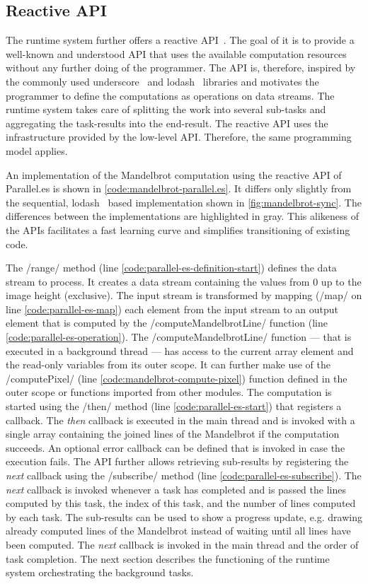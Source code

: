 \subsection{Reactive API}
The runtime system further offers a reactive API~\cite{Meijer2012}. The goal of it is to provide a well-known and understood API that uses the available computation resources without any further doing of the programmer. The API is, therefore, inspired by the commonly used underscore~\cite{underscorejs} and lodash~\cite{lodash} libraries and motivates the programmer to define the computations as operations on data streams. The runtime system takes care of splitting the work into several sub-tasks and aggregating the task-results into the end-result. The reactive API uses the infrastructure provided by the low-level API. Therefore, the same programming model applies.


 An implementation of the Mandelbrot computation using the reactive API of Parallel.es is shown in \cref{code:mandelbrot-parallel.es}. It differs only slightly from the sequential, lodash~\cite{lodash} based implementation shown in \cref{fig:mandelbrot-sync}. The differences between the implementations are highlighted in gray. This alikeness of the APIs facilitates a fast learning curve and simplifies transitioning of existing code. 
 
 The \javascriptinline/range/ method (line \ref{code:parallel-es-definition-start}) defines the data stream to process. It creates a data stream containing the values from 0 up to the image height (exclusive). The input stream is transformed by mapping (\javascriptinline/map/ on line \ref{code:parallel-es-map}) each element from the input stream to an output element that is computed by the \javascriptinline/computeMandelbrotLine/ function (line \ref{code:parallel-es-operation}). The \javascriptinline/computeMandelbrotLine/ function --- that is executed in a background thread --- has access to the current array element and the read-only variables from its outer scope. It can further make use of the \javascriptinline/computePixel/ (line \ref{code:mandelbrot-compute-pixel}) function defined in the outer scope or functions imported from other modules. The computation is started using the \javascriptinline/then/ method (line \ref{code:parallel-es-start}) that registers a callback. The \textit{then} callback is executed in the main thread and is invoked with a single array containing the joined lines of the Mandelbrot if the computation succeeds. An optional error callback can be defined that is invoked in case the execution fails. The API further allows retrieving sub-results by registering the \textit{next} callback using the \javascriptinline/subscribe/ method (line \ref{code:parallel-es-subscribe}). The \textit{next} callback is invoked whenever a task has completed and is passed the lines computed by this task, the index of this task, and the number of lines computed by each task. The sub-results can be used to show a progress update, e.g. drawing already computed lines of the Mandelbrot instead of waiting until all lines have been computed. The \textit{next} callback is invoked in the main thread and the order of task completion. The next section describes the functioning of the runtime system orchestrating the background tasks.
 
